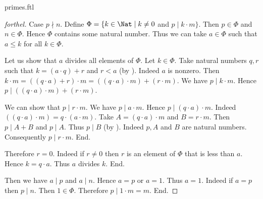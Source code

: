 \documentclass{naproche-library}
\begin{document}
\begin{smodule}[title=Prime Numbers]{primes.ftl}
\begin{proof}[forthel]
  Case $p \nmid n$.
    Define $\Phi = \{ k \in \Nat \mid k \neq 0$ and $p \mid k \cdot m \}$.
    Then $p \in \Phi$ and $n \in \Phi$.
    Hence $\Phi$ contains some natural number.
    Thus we can take $a \in \Phi$ such that $a \leq k$ for all $k \in \Phi$.

    Let us show that $a$ divides all elements of $\Phi$.
      Let $k \in \Phi$.
      Take natural numbers $q, r$ such that $k = (a \cdot q) + r$ and $r < a$ (by ).
      Indeed $a$ is nonzero.
      Then $k \cdot m
        = ((q \cdot a) + r) \cdot m
        = ((q \cdot a) \cdot m) + (r \cdot m)$.
      We have $p \mid k \cdot m$.
      Hence $p \mid ((q \cdot a) \cdot m) + (r \cdot m)$.

      We can show that $p \mid r \cdot m$.
        We have $p \mid a \cdot m$.
        Hence $p \mid (q \cdot a) \cdot m$.
        Indeed $((q \cdot a) \cdot m) = q \cdot (a \cdot m)$. %
        Take $A = (q \cdot a) \cdot m$ and $B = r \cdot m$. %
        Then $p \mid A + B$ and $p \mid A$.
        Thus $p \mid B$ (by ).
        Indeed $p, A$ and $B$ are natural numbers.
        Consequently $p \mid r \cdot m$.
      End.

      Therefore $r = 0$.
      Indeed if $r \neq 0$ then $r$ is an element of $\Phi$ that is less than $a$.
      Hence $k = q \cdot a$.
      Thus $a$ divides $k$.
    End.

    Then we have $a \mid p$ and $a \mid n$.
    Hence $a = p$ or $a = 1$.
    Thus $a = 1$.
    Indeed if $a = p$ then $p \mid n$.
    Then $1 \in \Phi$.
    Therefore $p \mid 1 \cdot m = m$.
  End.
\end{proof}
\end{smodule}
\end{document}
